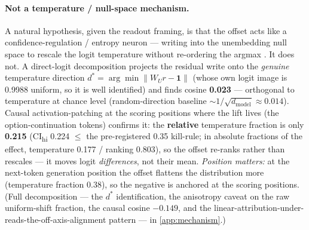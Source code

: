 \paragraph{Not a temperature / null-space mechanism.}
A natural hypothesis, given the readout framing, is that the offset acts like a
confidence-regulation / entropy neuron --- writing into the unembedding null space
to rescale the logit temperature without re-ordering the argmax
\citep{ConfidenceRegulationNeurons}. It does not. A direct-logit decomposition
projects the residual write onto the \emph{genuine} temperature direction
$d^{*} = \arg\min\|W_U r - \mathbf{1}\|$ (whose own logit image is 0.9988 uniform,
so it is well identified) and finds cosine \textbf{0.023} --- orthogonal to
temperature at chance level (random-direction baseline
${\sim}1/\sqrt{d_{\mathrm{model}}} \approx 0.014$). Causal activation-patching at
the scoring positions where the lift lives (the option-continuation tokens)
confirms it: the \textbf{relative} temperature fraction is only \textbf{0.215}
(CI\textsubscript{hi} 0.224 ${\leq}$ the pre-registered 0.35 kill-rule; in absolute
fractions of the effect, temperature 0.177 / ranking 0.803), so the offset re-ranks
rather than rescales --- it moves logit \emph{differences}, not their mean.
\emph{Position matters:} at the next-token generation position the offset flattens
the distribution more (temperature fraction 0.38), so the negative is anchored at
the scoring positions. (Full decomposition --- the $d^{*}$ identification, the
anisotropy caveat on the raw uniform-shift fraction, the causal cosine $-0.149$,
and the linear-attribution-under-reads-the-off-axis-alignment pattern
\citep{LeverageIsNotReach} --- in \cref{app:mechanism}.)

